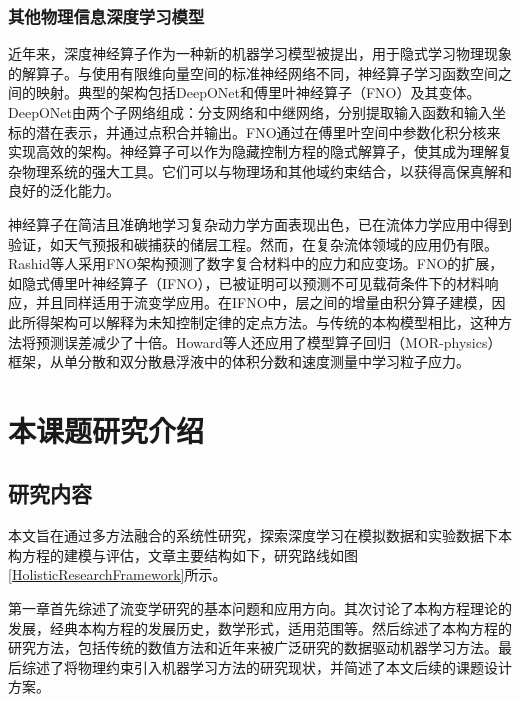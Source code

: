 \subsubsection{其他物理信息深度学习模型}
近年来，深度神经算子作为一种新的机器学习模型被提出，用于隐式学习物理现象的解算子\cite{luLearningNonlinearOperators2021}。与使用有限维向量空间的标准神经网络不同，神经算子学习函数空间之间的映射。典型的架构包括DeepONet和傅里叶神经算子（FNO）及其变体。DeepONet由两个子网络组成：分支网络和中继网络，分别提取输入函数和输入坐标的潜在表示，并通过点积合并输出。FNO通过在傅里叶空间中参数化积分核来实现高效的架构。神经算子可以作为隐藏控制方程的隐式解算子，使其成为理解复杂物理系统的强大工具。它们可以与物理场和其他域约束结合，以获得高保真解和良好的泛化能力。

神经算子在简洁且准确地学习复杂动力学方面表现出色，已在流体力学应用中得到验证，如天气预报和碳捕获的储层工程。然而，在复杂流体领域的应用仍有限。Rashid等人采用FNO架构预测了数字复合材料中的应力和应变场\cite{rashid2022learning}。FNO的扩展，如隐式傅里叶神经算子（IFNO），已被证明可以预测不可见载荷条件下的材料响应，并且同样适用于流变学应用\cite{you2022learning}。在IFNO中，层之间的增量由积分算子建模，因此所得架构可以解释为未知控制定律的定点方法。与传统的本构模型相比，这种方法将预测误差减少了十倍。Howard等人还应用了模型算子回归（MOR-physics）框架，从单分散和双分散悬浮液中的体积分数和速度测量中学习粒子应力\cite{howardMachineLearningMethods2023}。

\section{本课题研究介绍}
\subsection{研究内容}
本文旨在通过多方法融合的系统性研究，探索深度学习在模拟数据和实验数据下本构方程的建模与评估，文章主要结构如下，研究路线如图\ref{HolisticResearchFramework}所示。

第一章首先综述了流变学研究的基本问题和应用方向。其次讨论了本构方程理论的发展，经典本构方程的发展历史，数学形式，适用范围等。然后综述了本构方程的研究方法，包括传统的数值方法和近年来被广泛研究的数据驱动机器学习方法。最后综述了将物理约束引入机器学习方法的研究现状，并简述了本文后续的课题设计方案。

